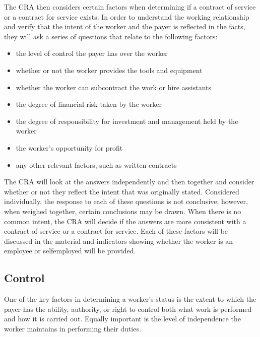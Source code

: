 \documentclass[letterpaper,10pt,english]{sphinxmanual}
\begin{document}
\sphinxAtStartPar
{}
The CRA then considers certain factors when determining if a contract of service or a
contract for service exists. In order to understand the working relationship and verify that the
intent of the worker and the payer is reflected in the facts, they will ask a series of questions
that relate to the following factors:
\begin{itemize}
\item {} 
\sphinxAtStartPar
the level of control the payer has over the worker

\item {} 
\sphinxAtStartPar
whether or not the worker provides the tools and equipment

\item {} 
\sphinxAtStartPar
whether the worker can subcontract the work or hire assistants

\item {} 
\sphinxAtStartPar
the degree of financial risk taken by the worker

\item {} 
\sphinxAtStartPar
the degree of responsibility for investment and management held by the worker

\item {} 
\sphinxAtStartPar
the worker’s opportunity for profit

\item {} 
\sphinxAtStartPar
any other relevant factors, such as written contracts

\end{itemize}

\sphinxAtStartPar
The CRA will look at the answers independently and then together and consider whether or
not they reflect the intent that was originally stated. Considered individually, the response to
each of these questions is not conclusive; however, when weighed together, certain
conclusions may be drawn. When there is no common intent, the CRA will decide if the
answers are more consistent with a contract of service or a contract for service.
Each of these factors will be discussed in the material and indicators showing whether the
worker is an employee or self\sphinxhyphen{}employed will be provided.


\subsection{Control}
\label{\detokenize{3_contracts:control}}
\sphinxAtStartPar
One of the key factors in determining a worker’s status is the extent to which the payer has the ability, authority, or
right to control both what work is performed and how it is carried out. Equally important is the level of independence the
worker maintains in performing their duties.
\end{document}
